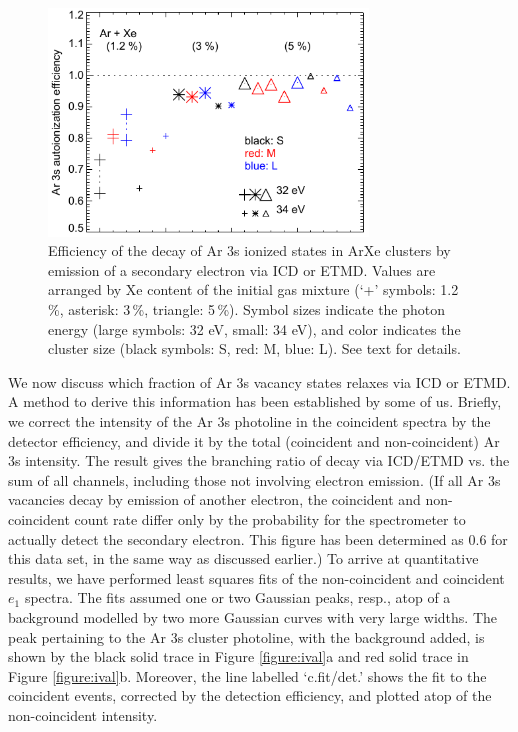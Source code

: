 \begin{figure}[ht]
 \centering
 \includegraphics[width=8.5cm]{pics/figure_eff.pdf}
 \caption{
Efficiency of the decay of Ar 3s ionized states in ArXe clusters by emission of a secondary electron via ICD or ETMD. Values are arranged by Xe content of the initial gas mixture (`+' symbols: 1.2\,\%, asterisk: 3\,\%, triangle: 5\,\%). Symbol sizes indicate the photon energy (large symbols: 32 eV, small: 34 eV), and color indicates the cluster size (black symbols: S, red: M, blue: L). See text for details.
}
 \label{figure:eff}
\end{figure}
%
We now discuss which fraction of Ar 3s vacancy states relaxes via ICD or ETMD.
A method to derive this information has been established by some of us.\cite{foerstel_2013}
Briefly, we correct the intensity of the Ar 3s photoline in the coincident spectra by the detector efficiency, and divide it by the total (coincident and non-coincident) Ar 3s intensity.
The result gives the branching ratio of decay via ICD/ETMD vs. the sum of all channels, including those not involving electron emission.
(If all Ar 3s vacancies decay by emission of another electron, the coincident and non-coincident count rate differ only by the probability for the spectrometer to actually detect the secondary electron.
This figure has been determined as 0.6 for this data set, in the same way as discussed earlier.\cite{mucke_review})
To arrive at quantitative results, we have performed least squares fits of the non-coincident and coincident $e_1$ spectra.
The fits assumed one or two Gaussian peaks, resp., atop of a background modelled by two more Gaussian curves with very large widths.
The peak pertaining to the Ar 3s cluster photoline, with the background added, is shown by the black solid trace in Figure \ref{figure:ival}a and red solid trace in Figure \ref{figure:ival}b.
Moreover, the line labelled `c.fit/det.' shows the fit to the coincident events, corrected by the detection efficiency, and plotted atop of the non-coincident intensity. 
